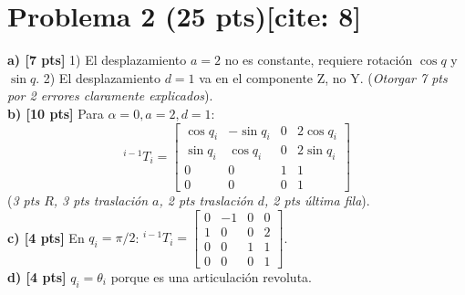\documentclass[11pt, a4paper]{article}
\begin{document}
\section*{Problema 2 (25 pts)[cite: 8]}
\textbf{a) [7 pts]} 1) El desplazamiento $a=2$ no es constante, requiere rotación $\cos q$ y $\sin q$. 2) El desplazamiento $d=1$ va en el componente Z, no Y. (\textit{Otorgar 7 pts por 2 errores claramente explicados}).\\
\textbf{b) [10 pts]} Para $\alpha=0, a=2, d=1$:
\begin{equation*}
    {}^{i-1}T_i = \begin{bmatrix} \cos q_i & -\sin q_i & 0 & 2\cos q_i \\ \sin q_i & \cos q_i & 0 & 2\sin q_i \\ 0 & 0 & 1 & 1 \\ 0 & 0 & 0 & 1 \end{bmatrix}
\end{equation*}
(\textit{3 pts $R$, 3 pts traslación $a$, 2 pts traslación $d$, 2 pts última fila}).\\
\textbf{c) [4 pts]} En $q_i = \pi/2$: ${}^{i-1}T_i = \begin{bmatrix} 0 & -1 & 0 & 0 \\ 1 & 0 & 0 & 2 \\ 0 & 0 & 1 & 1 \\ 0 & 0 & 0 & 1 \end{bmatrix}$.\\
\textbf{d) [4 pts]} $q_i = \theta_i$ porque es una articulación revoluta.
\end{document}
